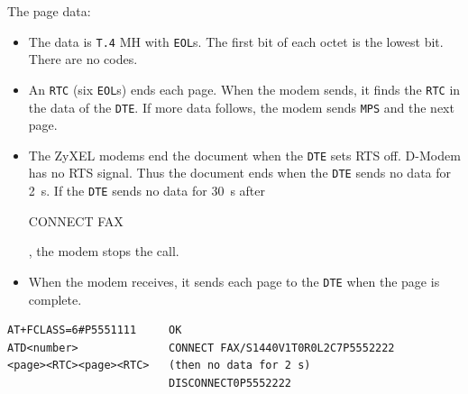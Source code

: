 \documentclass[a5paper,10pt]{article}
\makeatletter
\newcommand{\dmextitle}{Example}
\newcommand{\example}[1]{\renewcommand{\dmextitle}{#1}}
\newcommand{\cmd}[1]{\texttt{#1}}
\DeclareRobustCommand{\rc}[1]{{\setlength{\fboxsep}{1pt}%
  \colorbox{dmrc}{\ttfamily\color{dmnavy}\rule[-0.45ex]{0pt}{1.95ex}#1}}}
\newcommand{\std}[1]{\texttt{#1}}
\let\cmd\@firstofone
\makeatother
\begin{document}
The page data:
\begin{itemize}
\item The data is \std{T.4} MH with \std{EOL}s.  The first bit of each
  octet is the lowest bit.  There are no \cmd{<DLE>} codes.
\item An \std{RTC} (six \std{EOL}s) ends each page.  When the modem
  sends, it finds the \std{RTC} in the data of the \std{DTE}.  If more
  data follows, the modem sends \std{MPS} and the next page.
\item The ZyXEL modems end the document when the \std{DTE} sets RTS
  off.  D-Modem has no RTS signal.  Thus the document ends when the
  \std{DTE} sends no data for 2~s.  If the \std{DTE} sends no data for
  30~s after \rc{CONNECT FAX}, the modem stops the call.
\item When the modem receives, it sends each page to the \std{DTE} when
  the page is complete.
\end{itemize}

\example{Example session: send two pages}
\begin{verbatim}
AT+FCLASS=6#P5551111     OK
ATD<number>              CONNECT FAX/S1440V1T0R0L2C7P5552222
<page><RTC><page><RTC>   (then no data for 2 s)
                         DISCONNECT0P5552222
\end{verbatim}
\end{document}
